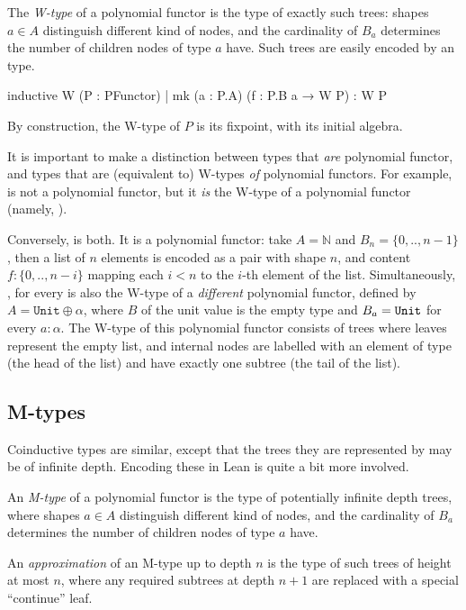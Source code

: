 The \emph{W-type} of a polynomial functor  is the type of exactly such trees: shapes $a ∈ A$ distinguish different kind of nodes, and the cardinality of $B_a$ determines the number of children nodes of type $a$ have. Such trees are easily encoded by an \inductive{} type.

\begin{leancode}
    inductive W (P : PFunctor)
    | mk (a : P.A) (f : P.B a → W P) : W P
\end{leancode}

By construction, the W-type of $P$ is its fixpoint, with  its initial algebra.

It is important to make a distinction between types that \emph{are} polynomial functor, and types that are (equivalent to) W-types \emph{of} polynomial functors. 
For example,  is not a polynomial functor, but it \emph{is} the W-type of a polynomial functor (namely, ). 

Conversely,  is both. It is a polynomial functor: take $A = \mathbb{N}$ and $B_n = \{0,..,n-1\}$, then a list of $n$ elements is encoded as a pair with shape $n$, and content $f : \{0,..,n-i\}$ mapping each $i < n$ to the $i$-th element of the list. 
Simultaneously, , for every  is also the W-type of a \emph{different} polynomial functor, defined by $A = \texttt{Unit} ⊕ α$, where $B$ of the unit value is the empty type and $B_a = \lean{Unit}$ for every $a : α$. The W-type of this polynomial functor consists of trees where leaves represent the empty list, and internal nodes are labelled with an element of type  (the head of the list) and have exactly one subtree (the tail of the list).

\subsection*{M-types}
Coinductive types are similar, except that the trees they are represented by may be of infinite depth. Encoding these in Lean is quite a bit more involved.

An \emph{M-type} of a polynomial functor  is the type of potentially infinite depth trees, where shapes $a ∈ A$ distinguish different kind of nodes, and the cardinality of $B_a$ determines the number of children nodes of type $a$ have.

An \emph{approximation} of an M-type up to depth $n$ is the type of such trees of height at most $n$, where any required subtrees at depth $n+1$ are replaced with a special ``continue'' leaf. 

